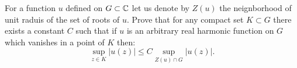 For a function ${u}$ defined on ${G \subset \Bbb{C}}$ let us denote by ${Z(u)}$ the neignborhood of unit raduis of the set of roots of ${u}$.
Prove that for any compact set ${K \subset G}$ there exists a constant ${C}$ such that if ${u}$ is an arbitrary real harmonic function on ${G}$ which vanishes in a point of ${K}$ then:
\[\displaystyle \sup_{z \in K} |u(z)| \leq C \sup_{Z(u)\cap G}|u(z)|.\]